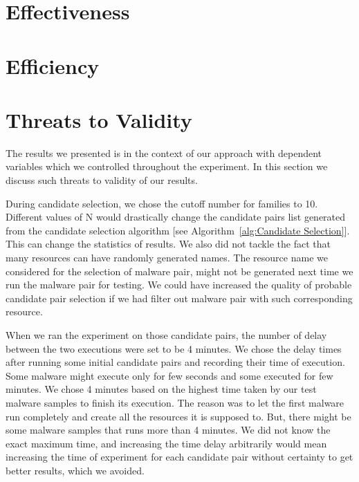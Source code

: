 \section{Effectiveness}
\label{sec:Effectiveness}
\section{Efficiency}
\label{sec:Efficiency}


\section{Threats to Validity}
\label{sec:Threats to Validity}
The results we presented is in the context of our approach with dependent variables which we controlled throughout the experiment.
In this section we discuss such threats to validity of our results.

During candidate selection, we chose the cutoff number for families to 10.
Different values of N would drastically change the candidate pairs list generated from the candidate selection algorithm [see Algorithm~\autoref{alg:Candidate Selection}].
This can change the statistics of results.
We also did not tackle the fact that many resources can have randomly generated names.
The resource name we considered for the selection of malware pair, might not be generated next time we run the malware pair for testing.
We could have increased the quality of probable candidate pair selection if we had filter out malware pair with such corresponding resource.

When we ran the experiment on those candidate pairs, the number of delay between the two executions were set to be 4 minutes.
We chose the delay times after running some initial candidate pairs and recording their time of execution.
Some malware might execute only for few seconds and some executed for few minutes.
We chose 4 minutes based on the highest time taken by our test malware samples to finish its execution.
The reason was to let the first malware run completely and create all the resources it is supposed to.
But, there might be some malware samples that runs more than 4 minutes.
We did not know the exact maximum time, and increasing the time delay arbitrarily would mean increasing the time of experiment for each candidate pair without certainty to get better results, which we avoided.


